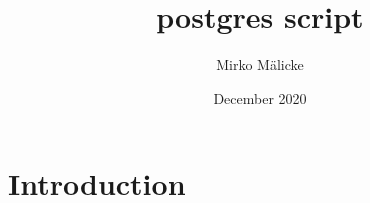 \documentclass{article}
\title{postgres script}
\author{Mirko Mälicke}
\date{December 2020}
\begin{document}
\maketitle

\section{Introduction}
\end{document}

